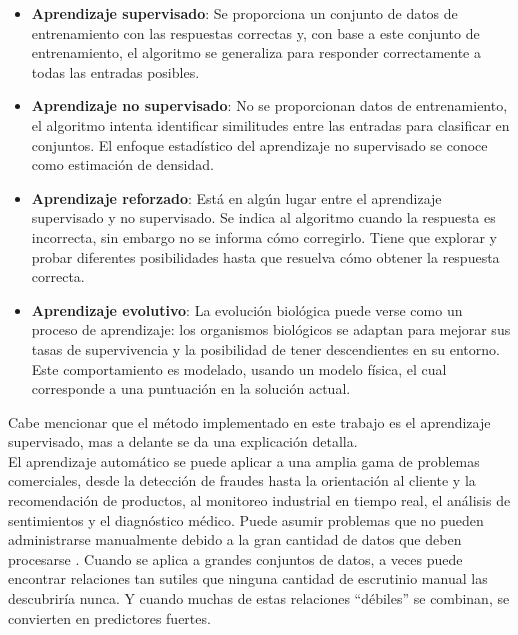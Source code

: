\begin{itemize}

	\item \textbf{Aprendizaje supervisado}: Se proporciona un conjunto de datos de entrenamiento con las respuestas correctas y, con base a este conjunto de 
	entrenamiento, el algoritmo se generaliza para responder correctamente a todas 
	las entradas posibles.

	\item \textbf{Aprendizaje no supervisado}: No se proporcionan datos de entrenamiento, el algoritmo intenta identificar similitudes entre las entradas para clasificar en conjuntos. El enfoque estadístico del aprendizaje no 
	supervisado se conoce como estimación de densidad.

	\item \textbf{Aprendizaje reforzado}: Está en algún lugar entre el aprendizaje supervisado y no supervisado. Se indica al algoritmo cuando la respuesta es incorrecta, sin embargo no se informa
	cómo corregirlo. Tiene que explorar y probar diferentes posibilidades hasta que resuelva 
	cómo obtener la respuesta correcta.

	\item \textbf{Aprendizaje evolutivo}: La evolución biológica puede verse como un proceso de aprendizaje: los organismos biológicos se adaptan para mejorar sus tasas de supervivencia 
	y la posibilidad de tener descendientes en su entorno. Este comportamiento es modelado, 
	usando un modelo física, el cual corresponde a una puntuación en la 
	solución actual.

\end{itemize}

Cabe mencionar que el método implementado en este trabajo es el aprendizaje supervisado, mas a delante se da una explicación detalla.\\

El aprendizaje automático se puede aplicar a una amplia gama de problemas comerciales, desde la detección de fraudes hasta la orientación al cliente y la recomendación de productos, al monitoreo industrial en tiempo real, el análisis de sentimientos y el diagnóstico médico. Puede asumir problemas que no pueden administrarse manualmente debido a la gran cantidad de datos que deben procesarse \citep{CT22}. Cuando se aplica a grandes conjuntos de datos, a veces puede encontrar relaciones tan sutiles que ninguna cantidad de escrutinio manual las descubriría nunca. Y cuando muchas de estas relaciones ``débiles'' se combinan, se convierten en predictores fuertes.





